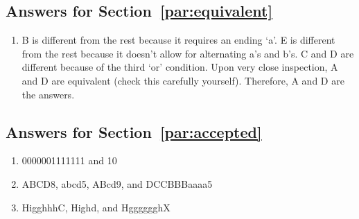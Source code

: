 \documentclass[10pt]{article}
\begin{document}
\subsection{Answers for Section~\ref{par:equivalent}}
\begin{enumerate}
\item B is different from the rest because it requires an ending `a'.
E is different from the rest because it doesn't allow for alternating a's and b's.
C and D are different because of the third `or' condition.
Upon very close inspection, A and D are equivalent (check this carefully yourself).
Therefore, A and D are the answers.
\end{enumerate}

\subsection{Answers for Section~\ref{par:accepted}}
\begin{enumerate}
\item 0000001111111 and 10
\item ABCD8, abcd5, ABcd9, and DCCBBBaaaa5
\item HigghhhC, Highd, and HgggggghX
\end{enumerate}

\end{document}
